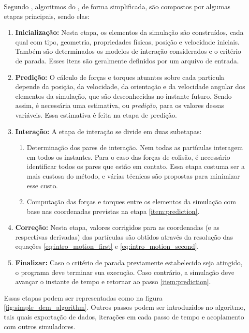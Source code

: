 Segundo , algoritmos do \DEM{}, de forma simplificada, são compostos por algumas etapas principais, sendo elas:
\begin{enumerate}
	\item \textbf{Inicialização:} Nesta etapa, os elementos da simulação são construídos, cada qual com tipo, geometria, propriedades físicas, posição e velocidade iniciais. Também são determinados os modelos de interação considerados e o critério de parada. Esses itens são geralmente definidos por um arquivo de entrada.
	\item \textbf{Predição:} O cálculo de forças e torques atuantes sobre cada partícula depende da posição, da velocidade, da orientação e da velocidade angular dos elementos da simulação, que são desconhecidas no instante futuro. Sendo assim, é necessária uma estimativa, ou \textit{predição}, para os valores dessas variáveis. Essa estimativa é feita na etapa de predição. \label{item:prediction}
	\item \textbf{Interação:} A etapa de interação se divide em duas subetapas:
		\begin{enumerate}
			\item Determinação dos pares de interação. Nem todas as partículas interagem em todos os instantes. Para o caso das forças de colisão, é necessário identificar todos os pares que estão em contato. Essa etapa costuma ser a mais custosa do método, e várias técnicas são propostas para minimizar esse custo.
			\item Computação das forças e torques entre os elementos da simulação com base nas coordenadas previstas na etapa \ref{item:prediction}.
		\end{enumerate}
	\item \textbf{Correção:} Nesta etapa, valores corrigidos para as coordenadas (e as respectivas derivadas) das partículas são obtidos através da resolução das equações \eqref{eq:intro_motion_first} e \eqref{eq:intro_motion_second}.
	\item \textbf{Finalizar:} Caso o critério de parada previamente estabelecido seja atingido, o programa deve terminar sua execução. Caso contrário, a simulação deve avançar o instante de tempo e retornar ao passo \ref{item:prediction}.
\end{enumerate}

Essas etapas podem ser representadas como na figura \ref{fig:simple_dem_algorithm}. Outros passos podem ser introduzidos no algoritmo, tais quais exportação de dados, iterações em cada passo de tempo e acoplamento com outros simuladores.

